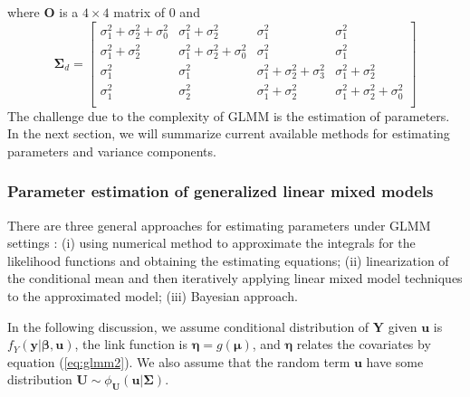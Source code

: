 where $\bm O$ is a $4\times 4$ matrix of 0 and 
\[
\bm \Sigma_d = \left[
\begin{array}{cccc}
\sigma^2_1+ \sigma^2_2 + \sigma^2_0  & \sigma^2_1+\sigma^2_2 & \sigma^2_1 &\sigma^2_1\\
\sigma^2_1+\sigma^2_2 & \sigma^2_1 +\sigma^2_2 +\sigma^2_0 &\sigma^2_1 &\sigma^2_1\\
\sigma^2_1 & \sigma^2_1& \sigma^2_1+\sigma^2_2+\sigma^2_3 & \sigma^2_1 + \sigma^2_2\\
\sigma^2_1 &\sigma^2_2 &\sigma^2_1 +\sigma^2_2 & \sigma^2_1 +\sigma^2_2 +\sigma^2_0\\
\end{array}
\right]
\]
The challenge due to the complexity of GLMM is the estimation of parameters. In the next section,
we will summarize current available methods for estimating parameters and variance components.

\subsubsection{Parameter estimation of generalized linear mixed models}\label{subsub:estimation}	
There are three general approaches for estimating parameters under GLMM settings \citep[Chapter
7]{myers2012generalized}: (i) using numerical method to approximate the integrals for the likelihood
functions and obtaining the estimating equations; (ii) linearization of the conditional mean and
then iteratively applying linear mixed model techniques to the approximated model; (iii) Bayesian
approach.  

In the following discussion, we assume conditional distribution of $\bm Y$ given $\bm u$ is
$f_{Y}(\bm y|\bm \beta, \bm u)$, the link function is $\bm \eta = g(\bm \mu)$, and $\bm \eta$
relates the covariates by equation (\ref{eq:glmm2}). We also assume that the random term $\bm u$ 
have some distribution $\bm U \sim \phi_{\bm U}(\bm u|\bm \Sigma)$. 	

